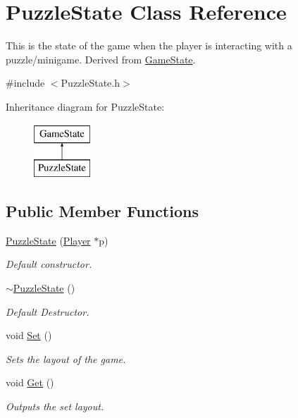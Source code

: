 \hypertarget{classPuzzleState}{\section{Puzzle\-State Class Reference}
\label{classPuzzleState}
}


This is the state of the game when the player is interacting with a puzzle/minigame. Derived from \hyperlink{classGameState}{Game\-State}.  




{\ttfamily \#include $<$Puzzle\-State.\-h$>$}

Inheritance diagram for Puzzle\-State\-:\begin{figure}[H]
\begin{center}
\leavevmode
\includegraphics[height=2.000000cm]{classPuzzleState}
\end{center}
\end{figure}
\subsection*{Public Member Functions}
\begin{DoxyCompactItemize}
\item 
\hyperlink{classPuzzleState_a62da37afc97f9a22a6730a32df9f657e}{Puzzle\-State} (\hyperlink{classPlayer}{Player} $\ast$p)
\begin{DoxyCompactList}\small\item\em Default constructor. \end{DoxyCompactList}\item 
\hyperlink{classPuzzleState_ab451829133cf607c0f0b33ef0bbb4529}{$\sim$\-Puzzle\-State} ()
\begin{DoxyCompactList}\small\item\em Default Destructor. \end{DoxyCompactList}\item 
void \hyperlink{classPuzzleState_a966b0f168ff5499f247c9ab519b524ab}{Set} ()
\begin{DoxyCompactList}\small\item\em Sets the layout of the game. \end{DoxyCompactList}\item 
void \hyperlink{classPuzzleState_ac9f6dd77d6471165d9eb2c18bd051dd1}{Get} ()
\begin{DoxyCompactList}\small\item\em Outputs the set layout. \end{DoxyCompactList}\end{DoxyCompactItemize}
